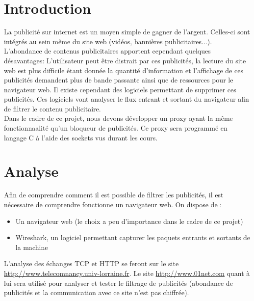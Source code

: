 \documentclass[a4paper,11pt, oneside]{book}
\author{Yann Prono, Quentin Tardivon}
\date{\today}
\begin{document}
	\begin{titlepage}
		
	\end{titlepage}


	\newpage\newpage\null\thispagestyle{empty}
	\newpage
		\tableofcontents
		\thispagestyle{empty}


	\chapter{Introduction}
	\setcounter{page}{1}

		La publicité sur internet est un moyen simple de gagner de l'argent.
		Celles-ci sont intégrés au sein même du site web (vidéos, bannières publicitaires...). L'abondance de contenus publicitaires apportent
		cependant quelques désavantages: L'utilisateur peut être distrait par ces publicités, la lecture du site web est plus difficile
		étant donnée la quantité d'information et l'affichage de ces publicités demandent plus de bande passante
		ainsi que de ressources pour le navigateur web. Il existe cependant des logiciels permettant de supprimer
		ces publicités. Ces logiciels vont analyser le flux entrant et sortant du navigateur afin de filtrer le contenu publicitaire.\\

		\noindent Dans le cadre de ce projet, nous devons développer un proxy ayant la même fonctionnaalité qu'un bloqueur de publicités.
		Ce proxy sera programmé en langage C à l'aide des sockets vus durant les cours.


	\chapter{Analyse}

		Afin de comprendre comment il est possible de filtrer les publicités, il est nécessaire de comprendre fonctionne un navigateur web.
		On dispose de :
		\begin{itemize}
			\item Un navigateur web (le choix a peu d'importance dans le cadre de ce projet)
			\item Wireshark, un logiciel permettant capturer les paquets entrants et sortants de la machine\\
		\end{itemize}
		\noindent L'analyse des échanges TCP et HTTP se feront sur le site
		\href{http://www.telecomnancy.univ-lorraine.fr}{http://www.telecomnancy.univ-lorraine.fr}.
		Le site \href{http://www.01net.com}{http://www.01net.com} quant à lui sera utilisé pour
		analyser et tester le filtrage de publicités (abondance de publicités et la communication avec ce site n'est pas chiffrée).
\end{document}
